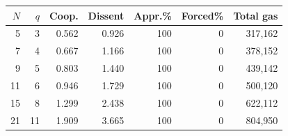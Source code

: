 \begin{tabular}{@{}rrrrrrr@{}}
\toprule
$N$ & $q$ & Coop. & Dissent & Appr.\% & Forced\% & Total gas \\
\midrule
5 & 3 & 0.562 & 0.926 & 100 & 0 & 317{,}162 \\
7 & 4 & 0.667 & 1.166 & 100 & 0 & 378{,}152 \\
9 & 5 & 0.803 & 1.440 & 100 & 0 & 439{,}142 \\
11 & 6 & 0.946 & 1.729 & 100 & 0 & 500{,}120 \\
15 & 8 & 1.299 & 2.438 & 100 & 0 & 622{,}112 \\
21 & 11 & 1.909 & 3.665 & 100 & 0 & 804{,}950 \\
\bottomrule
\end{tabular}